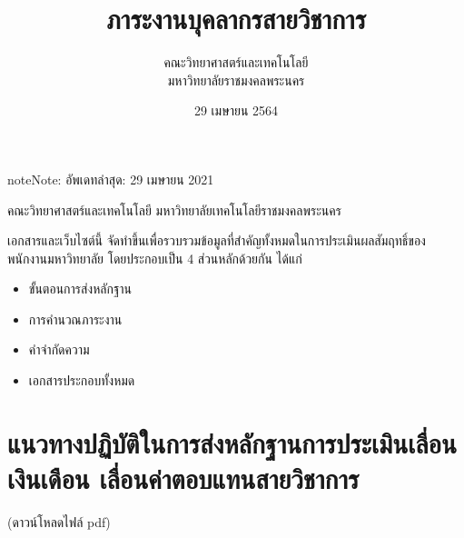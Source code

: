 \documentclass[a4paper,12pt,english]{sphinxmanual}
\title{ภาระงานบุคลากรสายวิชาการ}
\date{29 เมษายน 2564}
\author{คณะวิทยาศาสตร์และเทคโนโลยี \\ มหาวิทยาลัยราชมงคลพระนคร}
\begin{document}
\pagestyle{empty}
\sphinxmaketitle
\pagestyle{plain}
\sphinxtableofcontents
\pagestyle{normal}
\label{\detokenize{index::doc}}
\begin{sphinxadmonition}{note}{Note:}
อัพเดทล่าสุด: 29 เมษายน 2021
\end{sphinxadmonition}



คณะวิทยาศาสตร์และเทคโนโลยี มหาวิทยาลัยเทคโนโลยีราชมงคลพระนคร

เอกสารและเว็บไซต์นี้ จัดทำขึ้นเพื่อรวบรวมข้อมูลที่สำคัญทั้งหมดในการประเมินผลสัมฤทธิ์ของพนักงานมหาวิทยาลัย โดยประกอบเป็น 4 ส่วนหลักด้วยกัน ได้แก่
\begin{itemize}
\item {} 
ขั้นตอนการส่งหลักฐาน

\item {} 
การคำนวณภาระงาน

\item {} 
คำจำกัดความ

\item {} 
เอกสารประกอบทั้งหมด

\end{itemize}


\chapter{แนวทางปฏิบัติในการส่งหลักฐานการประเมินเลื่อนเงินเดือน เลื่อนค่าตอบแทนสายวิชาการ}
\label{\detokenize{howtosubmit:id1}}\label{\detokenize{howtosubmit::doc}}
 (ดาวน์โหลดไฟล์ pdf)

\noindent{}

\noindent{}

\noindent{}

\noindent{}

\noindent{}

\noindent{}

\noindent{}
\end{document}

